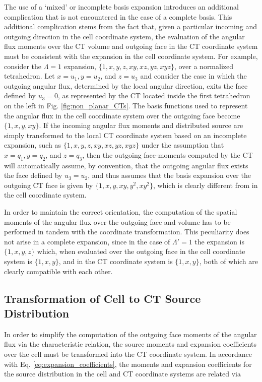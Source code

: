The use of a ‘mixed’ or incomplete basis expansion introduces an additional complication that is not encountered in the case of a complete basis.
This additional complication stems from the fact that, given a particular incoming and outgoing direction in the cell coordinate system, the evaluation of the angular flux moments over the \ac{CT} volume and outgoing face in the \ac{CT} coordinate system must be consistent with the expansion in the cell coordinate system.
For example, consider the $\Lambda = 1$ expansion, $\{1, x, y, z, xy, xz, yz, xyz \}$, over a normalized tetrahedron.
Let $x = u_1, y = u_2$, and $z = u_3$ and consider the case in which the outgoing angular flux, determined by the local angular direction, exits the face defined by $u_3 = 0$, as represented by the \ac{CT} located inside the first tetrahedron on the left in Fig. \ref{fig:non_planar_CTs}.
The basis functions used to represent the angular flux in the cell coordinate system over the outgoing face become $\{ 1, x, y, xy \}$.
If the incoming angular flux moments and distributed source are simply transformed to the local \ac{CT} coordinate system based on an incomplete expansion, such as $\{ 1, x, y, z, xy, xz, yz, xyz \}$ under the assumption that $x = q_1, y = q_2$, and $z = q_3$, then the outgoing face-moments computed by the \ac{CT} will automatically assume, by convention, that the outgoing angular flux exists the face defined by $u_3 = u_2$, and thus assumes that the basis expansion over the outgoing \ac{CT} face is given by $\{ 1, x, y, xy, y^2, xy^2 \}$, which is clearly different from in the cell coordinate system.

In order to maintain the correct orientation, the computation of the spatial moments of the angular flux over the outgoing face and volume has to be  performed in tandem with the coordinate transformation.
This peculiarity does not arise in a complete expansion, since in the case of $\Lambda ' = 1$ the expansion is $\{ 1, x, y, z \}$ which, when evaluated over the outgoing face in the cell coordinate system is $\{ 1, x, y \}$, and in the \ac{CT} coordinate system is $\{ 1, x, y \}$, both of which are clearly compatible with each other.

\subsection{Transformation of Cell to \ac{CT} Source Distribution}

In order to simplify the computation of the outgoing face moments of the angular flux via the characteristic relation, the source moments and expansion coefficients over the cell must be transformed into the \ac{CT} coordinate system.
In accordance with Eq. \ref{eq:expansion_coefficients}, the moments and expansion coefficients for the source distribution in the cell and \ac{CT} coordinate systems are related via

